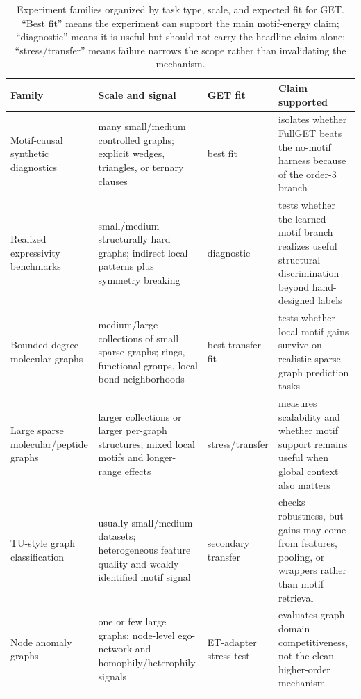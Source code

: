 \documentclass[11pt,a4paper]{article}
\begin{document}
\begin{table}[htbp]
\centering
\caption{Experiment families organized by task type, scale, and expected fit
for GET. ``Best fit'' means the experiment can support the main motif-energy
claim; ``diagnostic'' means it is useful but should not carry the headline
claim alone; ``stress/transfer'' means failure narrows the scope rather than
invalidating the mechanism.}
\label{tab:get-task-fit}
\renewcommand{\arraystretch}{1.08}
\footnotesize
\begin{tabularx}{\textwidth}{p{} p{} p{} Y}
\toprule
Family & Scale and signal & GET fit & Claim supported \\
\midrule
Motif-causal synthetic diagnostics
& many small/medium controlled graphs; explicit wedges, triangles, or ternary clauses
& best fit
& isolates whether FullGET beats the no-motif harness because of the order-3 branch \\
Realized expressivity benchmarks
& small/medium structurally hard graphs; indirect local patterns plus symmetry breaking
& diagnostic
& tests whether the learned motif branch realizes useful structural
  discrimination beyond hand-designed labels \\
Bounded-degree molecular graphs
& medium/large collections of small sparse graphs; rings, functional groups, local bond neighborhoods
& best transfer fit
& tests whether local motif gains survive on realistic sparse graph
  prediction tasks \\
Large sparse molecular/peptide graphs
& larger collections or larger per-graph structures; mixed local motifs and longer-range effects
& stress/transfer
& measures scalability and whether motif support remains useful when global
  context also matters \\
TU-style graph classification
& usually small/medium datasets; heterogeneous feature quality and weakly identified motif signal
& secondary transfer
& checks robustness, but gains may come from features, pooling, or wrappers
  rather than motif retrieval \\
Node anomaly graphs
& one or few large graphs; node-level ego-network and homophily/heterophily signals
& ET-adapter stress test
& evaluates graph-domain competitiveness, not the clean higher-order mechanism \\
\bottomrule
\end{tabularx}
\end{table}
\end{document}
